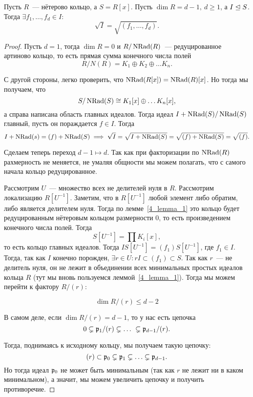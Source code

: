  	\begin{theorem} 
 		Пусть $R$~--- нётерово кольцо, а $S = R[x]$. Пусть $\dim{R} = d - 1, \ d \ge 1$, а $I \trianglelefteq S$. Тогда $\exists f_1, \ldots, f_{d} \in I\colon$
 		\[
 			\sqrt{I} = \sqrt{(f_1, \ldots, f_d)}.
 		\]
 	\end{theorem}
 	\begin{proof}
 		Пусть $d = 1$, тогда $\dim{R} = 0$ и $R/\operatorname{NRad}(R)$~--- редуцированное артиново кольцо, то есть прямая сумма конечного числа полей 
 		\[
 			R/N(R) = K_1 \oplus K_2 \oplus \ldots K_n.
 		\]

 		С другой стороны, легко проверить, что $\operatorname{NRad}(R[x]) = \operatorname{NRad}(R)[x]$. Но тогда мы получаем, что 
 		\[
 			S/\operatorname{NRad}(S) \cong K_1[x] \oplus \ldots K_n[x],
 		\]
 		а справа написана область главных идеалов. Тогда идеал $I + \operatorname{NRad}(S)/\operatorname{NRad}(S)$ главный, пусть он пораждается $f \in I$. Тогда 
 		\[
 			I + \operatorname{NRad}(s) = (f) + \operatorname{NRad}(S) \implies \sqrt{I} = \sqrt{I + \operatorname{NRad}(S)} = \sqrt{(f) + \operatorname{NRad}(S)} = \sqrt{(f)}. 
  		\]

  		Сделаем теперь переход $d - 1 \mapsto d$. Так как при факторизации по $\operatorname{NRad}(R)$ рахмерность не меняется, не умаляя общности мы можем полагать, что с самого начала кольцо редуцированное. 

  		Рассмотрим $U$~--- множество всех не делителей нуля в $R$. Рассмотрим локализацию $R[U^{-1}]$. Заметим, что в $R[U^{-1}]$ любой элемент либо обратим, либо является делителем нуля.  Тогда по лемме~\ref{4_lemma_1} это кольцо будет редуцированным нётеровым кольцом размерности 0, то есть произведением конечного числа полей. Тогда 
  		\[
  			S[U^{-1}] = \prod K_i[x],
  		\]
  		то есть кольцо главных идеалов. Тогда  $IS[U^{-1}] = (f_1) S[U^{-1}]$, где $f_1 \in I$. Тогда, так как $I$ конечно порожден, $\exists r \in U\colon r I \subset (f_1) \subset S$. Так как $r$~--- не делитель нуля, он не лежит в объединении всех минимальных простых идеалов кольца $R$ (тут мы вновь пользуемся леммой~\ref{4_lemma_1}). Тогда мы можем перейти к фактору $R/(r)$:

  		\[
  			\dim{R/(r)} \le d - 2 
  		\]

  		В самом деле, если $\dim{R/(r)} = d - 1$, то у нас есть цепочка 
  		\[
  			0 \subsetneq \mathfrak{p}_1/(r) \subsetneq  \ldots \ \subsetneq \mathfrak{p}_{d - 1}/(r). 
  		\]

  		Тогда, поднимаясь к исходному кольцу, мы получаем такую цепочку: 
  		\[
  			(r) \subset \mathfrak{p}_0 \subsetneq \mathfrak{p}_1 \subsetneq \ldots \subsetneq \mathfrak{p}_{d - 1}.
  		\]
  		Но тогда идеал $\mathfrak{p}_0$ не может быть минимальным (так как $r$ не лежит ни в каком минимальном), а значит, мы можем увеличить цепочку и получить противоречие. 


\end{proof}
